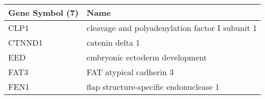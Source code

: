 \begin{tabular}{ll}
\toprule
Gene Symbol (7) &                                            Name \\
\midrule
           CLP1 & cleavage and polyadenylation factor I subunit 1 \\
         CTNND1 &                                 catenin delta 1 \\
            EED &                  embryonic ectoderm development \\
           FAT3 &                         FAT atypical cadherin 3 \\
           FEN1 &          flap structure-specific endonuclease 1 \\
\bottomrule
\end{tabular}
